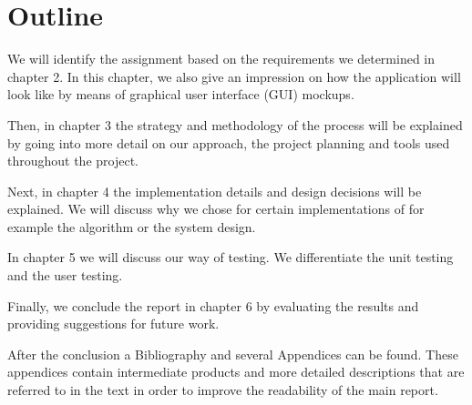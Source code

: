\section{Outline}
We will identify the assignment based on the requirements we determined in chapter 2. 
In this chapter, we also give an impression on how the application will look like by means of graphical user interface (GUI) mockups.

Then, in chapter 3 the strategy and methodology of the process will be explained by going into more detail on our approach, the project planning and tools used throughout the project.

Next, in chapter 4 the implementation details and design decisions will be explained.
We will discuss why we chose for certain implementations of for example the algorithm or the system design.

In chapter 5 we will discuss our way of testing. 
We differentiate the unit testing and the user testing.

Finally, we conclude the report in chapter 6 by evaluating the results and providing suggestions for future work.

After the conclusion a Bibliography and several Appendices can be found. 
These appendices contain intermediate products and more detailed descriptions that are referred to in the text in order to improve the readability of the main report.
